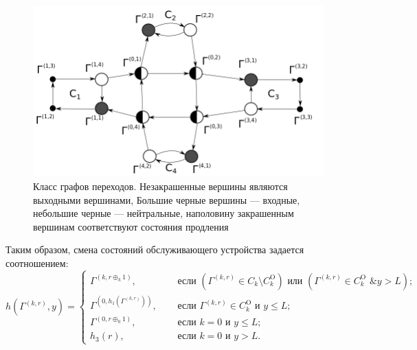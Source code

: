 \documentclass{report}
\begin{document}
\begin{figure}[h]\centering
\includegraphics[scale=0.5]{GraphScheme3_grayscale.png} 
\caption{Класс графов переходов. Незакрашенные вершины являются выходными вершинами, Большие черные вершины --- входные, небольшие черные --- нейтральные, наполовину закрашенным вершинам соответствуют состояния продления}
\label{GraphScheme}
\end{figure}

Таким образом, смена состояний обслуживающего устройства задается соотношением:
\begin{equation}
h(\Gamma^{(k,r)},y) = 
\begin{cases}
\Gamma^{(k,r \oplus_k 1)},& \quad \text{ если } (\Gamma^{(k,r)}\in C_k\setminus C_k^{\mathrm{O}}) \text{ или } (\Gamma^{(k,r)}\in C_k^{\mathrm{O}} \text{ \& } y>L);\\
\Gamma^{(0,h_1(\Gamma^{(k,r)}))},& \quad \text{ если } \Gamma^{(k,r)}\in C_k^{\mathrm{O}} \text{ и } y\leqslant L;\\
\Gamma^{(0,r \oplus_0 1)},& \quad \text{ если } k=0 \text{ и } y\leqslant L;\\
h_3(r),& \quad \text{ если } k=0 \text{ и } y > L.
\end{cases}
\label{hLaw}
\end{equation}
\end{document}

